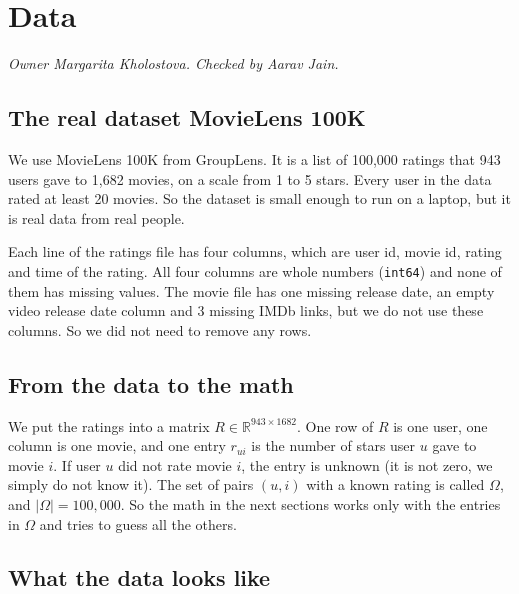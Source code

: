 
\section{Data}
\textit{Owner Margarita Kholostova. Checked by Aarav Jain.}

\subsection{The real dataset MovieLens 100K}

We use MovieLens 100K from GroupLens. It is a list of 100{,}000 ratings that 943 users gave to 1{,}682 movies, on a scale from 1 to 5 stars. Every user in the data rated at least 20 movies. So the dataset is small enough to run on a laptop, but it is real data from real people.

Each line of the ratings file has four columns, which are user id, movie id, rating and time of the rating. All four columns are whole numbers (\texttt{int64}) and none of them has missing values. The movie file has one missing release date, an empty video release date column and 3 missing IMDb links, but we do not use these columns. So we did not need to remove any rows.

\subsection{From the data to the math}

We put the ratings into a matrix $R \in \mathbb{R}^{943 \times 1682}$. One row of $R$ is one user, one column is one movie, and one entry $r_{ui}$ is the number of stars user $u$ gave to movie $i$. If user $u$ did not rate movie $i$, the entry is unknown (it is not zero, we simply do not know it). The set of pairs $(u,i)$ with a known rating is called $\Omega$, and $|\Omega| = 100{,}000$. So the math in the next sections works only with the entries in $\Omega$ and tries to guess all the others.

\subsection{What the data looks like}

